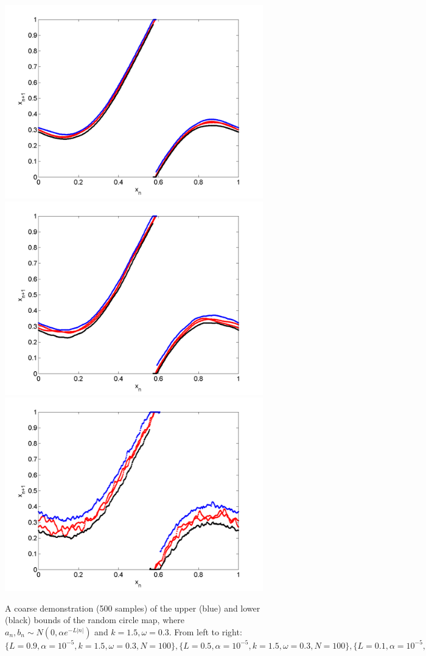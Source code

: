 \begin{figure}[htp]
\caption[Upper and lower bounds on the random circle map, Normal
distribution for $k=1.5,\omega=0.3$]{A coarse
  demonstration (500 samples) of the upper (blue) and lower (black)
  bounds of the random circle map, where $a_n,b_n\sim N(0,\alpha e^{-L|n|})$
  and $k=1.5,\omega=0.3$. From left to right:
  $\{L=0.9,\alpha = 10^{-5},k=1.5,\omega=0.3,N=100\}, \{L=0.5,\alpha = 10^{-5},k=1.5,\omega=0.3,N=100\},\{L=0.1,\alpha = 10^{-5},k=1.5,\omega=0.3,N=100\},$
  }\label{fig:circ_n_envelope2}
\centering
\includegraphics[width=.3\textwidth]{figs/envelope_norm_500_k15_L09_w03.png}\hfill
\includegraphics[width=.3\textwidth]{figs/envelope_norm_500_k15_L05_w03.png}\hfill
\includegraphics[width=.3\textwidth]{figs/envelope_norm_500_k15_L01_w03.png}
\end{figure}
